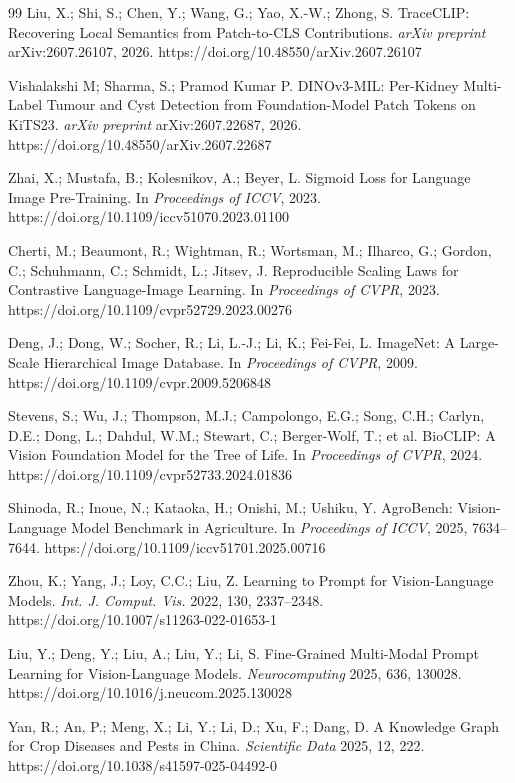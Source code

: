 \documentclass[10pt,a4paper]{article}
\begin{document}
\begin{thebibliography}{99}
Liu, X.; Shi, S.; Chen, Y.; Wang, G.; Yao, X.-W.; Zhong, S.
TraceCLIP: Recovering Local Semantics from Patch-to-CLS Contributions.
\emph{arXiv preprint} arXiv:2607.26107, 2026.
https://doi.org/10.48550/arXiv.2607.26107

Vishalakshi M; Sharma, S.; Pramod Kumar P.
DINOv3-MIL: Per-Kidney Multi-Label Tumour and Cyst Detection from Foundation-Model Patch Tokens on KiTS23.
\emph{arXiv preprint} arXiv:2607.22687, 2026.
https://doi.org/10.48550/arXiv.2607.22687

Zhai, X.; Mustafa, B.; Kolesnikov, A.; Beyer, L.
Sigmoid Loss for Language Image Pre-Training.
In \emph{Proceedings of ICCV}, 2023.
https://doi.org/10.1109/iccv51070.2023.01100

Cherti, M.; Beaumont, R.; Wightman, R.; Wortsman, M.; Ilharco, G.; Gordon, C.; Schuhmann, C.; Schmidt, L.; Jitsev, J.
Reproducible Scaling Laws for Contrastive Language-Image Learning.
In \emph{Proceedings of CVPR}, 2023.
https://doi.org/10.1109/cvpr52729.2023.00276

Deng, J.; Dong, W.; Socher, R.; Li, L.-J.; Li, K.; Fei-Fei, L.
ImageNet: A Large-Scale Hierarchical Image Database.
In \emph{Proceedings of CVPR}, 2009.
https://doi.org/10.1109/cvpr.2009.5206848

Stevens, S.; Wu, J.; Thompson, M.J.; Campolongo, E.G.; Song, C.H.; Carlyn, D.E.; Dong, L.; Dahdul, W.M.; Stewart, C.; Berger-Wolf, T.; et al.
BioCLIP: A Vision Foundation Model for the Tree of Life.
In \emph{Proceedings of CVPR}, 2024.
https://doi.org/10.1109/cvpr52733.2024.01836

Shinoda, R.; Inoue, N.; Kataoka, H.; Onishi, M.; Ushiku, Y.
AgroBench: Vision-Language Model Benchmark in Agriculture.
In \emph{Proceedings of ICCV}, 2025, 7634--7644.
https://doi.org/10.1109/iccv51701.2025.00716

Zhou, K.; Yang, J.; Loy, C.C.; Liu, Z.
Learning to Prompt for Vision-Language Models.
\emph{Int. J. Comput. Vis.} 2022, 130, 2337--2348.
https://doi.org/10.1007/s11263-022-01653-1

Liu, Y.; Deng, Y.; Liu, A.; Liu, Y.; Li, S.
Fine-Grained Multi-Modal Prompt Learning for Vision-Language Models.
\emph{Neurocomputing} 2025, 636, 130028.
https://doi.org/10.1016/j.neucom.2025.130028

Yan, R.; An, P.; Meng, X.; Li, Y.; Li, D.; Xu, F.; Dang, D.
A Knowledge Graph for Crop Diseases and Pests in China.
\emph{Scientific Data} 2025, 12, 222.
https://doi.org/10.1038/s41597-025-04492-0


\end{thebibliography}
\end{document}
